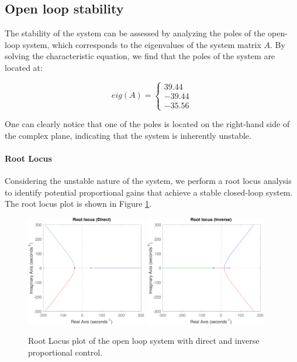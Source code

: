 \subsection{Open loop stability}
\label{subsec:open_loop_stability}

The stability of the system can be assessed by analyzing the poles of the open-loop system, which corresponds to the eigenvalues of the system matrix $A$.
By solving the characteristic equation, we find that the poles of the system are located at:

\begin{equation}
    eig(A) =
    \begin{cases}
        39.44  \\
        -39.44 \\
        -35.56
    \end{cases}
\end{equation}

One can clearly notice that one of the poles is located on the right-hand side of the complex plane, indicating that the system is inherently unstable.

\paragraph{Root Locus}

Considering the unstable nature of the system, we perform a root locus analysis to identify potential proportional gains that achieve a stable closed-loop system.
The root locus plot is shown in Figure \ref{fig:root_locus_plot}.

\begin{figure}[H]
    \centering
    \includegraphics[width=0.47\textwidth]{./img/MATLAB/analysis/root_locus_direct.pdf}
    \hfill
    \includegraphics[width=0.47\textwidth]{./img/MATLAB/analysis/root_locus_inverse.pdf}
    \caption{Root Locus plot of the open loop system with direct and inverse proportional control.}
    \label{fig:root_locus_plot}
\end{figure}


